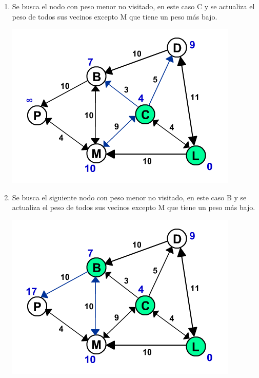 \documentclass[dcc,sol]{fcfmcourse}
\begin{document}
\begin{problems}
\begin{enumerate}[1.]
\item Se busca el nodo con peso menor no visitado, en este caso C y se actualiza el peso de todos sus vecinos excepto M que tiene un peso más bajo.
\begin{center}
\includegraphics[scale=0.65]{dijkstra0003.png}
\end{center}

\item Se busca el siguiente nodo con peso menor no visitado, en este caso B y se actualiza el peso de todos sus vecinos excepto M que tiene un peso más bajo.
\begin{center}
\includegraphics[scale=0.65]{dijkstra0004.png}
\end{center}


\end{enumerate}
\end{problems}
\end{document}
